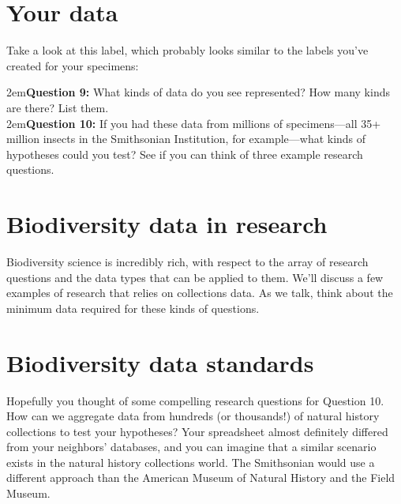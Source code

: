 \documentclass[letterpaper, 11pt]{article}
\newenvironment{labelfontsmall}{\fontfamily{phv}\selectfont}{\par}%
\begin{document}
\section*{Your data}
Take a look at this label, which probably looks similar to the labels you've created for your specimens:\\

\begin{labelfontsmall}
\tiny
{}
\end{labelfontsmall}
\normalsize\vspace{5mm}

\hangindent2em\textbf{Question 9:} What kinds of data do you see represented? How many kinds are there? List them.\\

\hangindent2em\textbf{Question 10:} If you had these data from millions of specimens---all 35+ million insects in the Smithsonian Institution, for example---what kinds of hypotheses could you test? See if you can think of three example research questions.\\



\section*{Biodiversity data in research}
Biodiversity science is incredibly rich, with respect to the array of research questions and the data types that can be applied to them. We'll discuss a few examples of research that relies on collections data. As we talk, think about the minimum data required for these kinds of questions.

\section*{Biodiversity data standards}
Hopefully you thought of some compelling research questions for Question 10. How can we aggregate data from hundreds (or thousands!) of natural history collections to test your hypotheses? Your spreadsheet almost definitely differed from your neighbors' databases, and you can imagine that a similar scenario exists in the natural history collections world. The Smithsonian would use a different approach than the American Museum of Natural History and the Field Museum. \\
\end{document}
